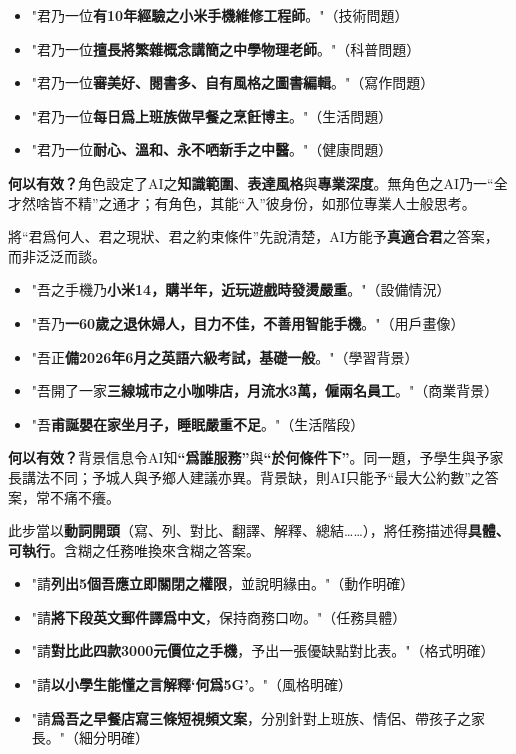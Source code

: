 \begin{itemize}
  \item "君乃一位\textbf{有10年經驗之小米手機維修工程師}。"（技術問題）
  \item "君乃一位\textbf{擅長將繁雜概念講簡之中學物理老師}。"（科普問題）
  \item "君乃一位\textbf{審美好、閱書多、自有風格之圖書編輯}。"（寫作問題）
  \item "君乃一位\textbf{每日爲上班族做早餐之烹飪博主}。"（生活問題）
  \item "君乃一位\textbf{耐心、溫和、永不哂新手之中醫}。"（健康問題）
\end{itemize}

\textbf{何以有效？}角色設定了AI之\textbf{知識範圍}、\textbf{表達風格}與\textbf{專業深度}。無角色之AI乃一“全才然啥皆不精”之通才；有角色，其能“入”彼身份，如那位專業人士般思考。


將“君爲何人、君之現狀、君之約束條件”先說清楚，AI方能予\textbf{真適合君}之答案，而非泛泛而談。


\begin{itemize}
  \item "吾之手機乃\textbf{小米14，購半年，近玩遊戲時發燙嚴重}。"（設備情況）
  \item "吾乃\textbf{一60歲之退休婦人，目力不佳，不善用智能手機}。"（用戶畫像）
  \item "吾正\textbf{備2026年6月之英語六級考試，基礎一般}。"（學習背景）
  \item "吾開了一家\textbf{三線城市之小咖啡店，月流水3萬，僱兩名員工}。"（商業背景）
  \item "吾\textbf{甫誕嬰在家坐月子，睡眠嚴重不足}。"（生活階段）
\end{itemize}

\textbf{何以有效？}背景信息令AI知\textbf{“爲誰服務”}與\textbf{“於何條件下”}。同一題，予學生與予家長講法不同；予城人與予鄉人建議亦異。背景缺，則AI只能予“最大公約數”之答案，常不痛不癢。


此步當以\textbf{動詞開頭}（寫、列、對比、翻譯、解釋、總結……），將任務描述得\textbf{具體、可執行}。含糊之任務唯換來含糊之答案。


\begin{itemize}
  \item "請\textbf{列出5個吾應立即關閉之權限}，並說明緣由。"（動作明確）
  \item "請\textbf{將下段英文郵件譯爲中文}，保持商務口吻。"（任務具體）
  \item "請\textbf{對比此四款3000元價位之手機}，予出一張優缺點對比表。"（格式明確）
  \item "請\textbf{以小學生能懂之言解釋‘何爲5G’}。"（風格明確）
  \item "請\textbf{爲吾之早餐店寫三條短視頻文案}，分別針對上班族、情侶、帶孩子之家長。"（細分明確）
\end{itemize}

